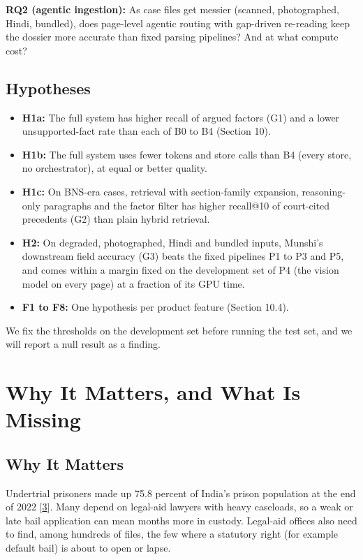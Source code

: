 \documentclass[10pt,a4paper]{article}
\begin{document}
\textbf{RQ2 (agentic ingestion):} As case files get messier (scanned, photographed, Hindi, bundled), does page-level agentic routing with gap-driven re-reading keep the dossier more accurate than fixed parsing pipelines? And at what compute cost?

\subsection{Hypotheses}

\begin{itemize}
\item \textbf{H1a:} The full system has higher recall of argued factors (G1) and a lower unsupported-fact rate than each of B0 to B4 (Section 10).
\item \textbf{H1b:} The full system uses fewer tokens and store calls than B4 (every store, no orchestrator), at equal or better quality.
\item \textbf{H1c:} On BNS-era cases, retrieval with section-family expansion, reasoning-only paragraphs and the factor filter has higher recall@10 of court-cited precedents (G2) than plain hybrid retrieval.
\item \textbf{H2:} On degraded, photographed, Hindi and bundled inputs, Munshi's downstream field accuracy (G3) beats the fixed pipelines P1 to P3 and P5, and comes within a margin fixed on the development set of P4 (the vision model on every page) at a fraction of its GPU time.
\item \textbf{F1 to F8:} One hypothesis per product feature (Section 10.4).
\end{itemize}

We fix the thresholds on the development set before running the test set, and we will report a null result as a finding.

\section{Why It Matters, and What Is Missing}

\subsection{Why It Matters}

Undertrial prisoners made up 75.8 percent of India's prison population at the end of 2022 [\href{https://www.ncrb.gov.in/uploads/nationalcrimerecordsbureau/custom/psiyearwise2022/1701613297PSI2022ason01122023.pdf}{3}]. Many depend on legal-aid lawyers with heavy caseloads, so a weak or late bail application can mean months more in custody. Legal-aid offices also need to find, among hundreds of files, the few where a statutory right (for example default bail) is about to open or lapse.
\end{document}
